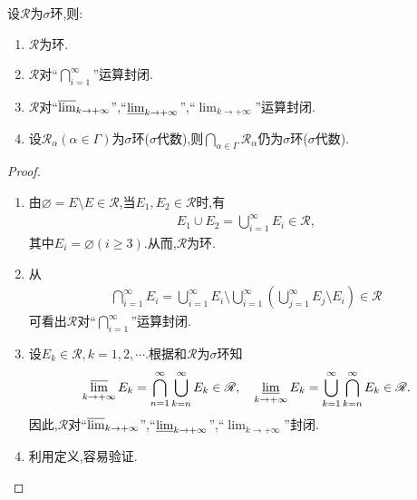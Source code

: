 \documentclass[../../main.tex]{subfiles}%
\begin{document}
\begin{theorem}\label{theorem:sigma环或代数的基本性质}
设$\mathscr{R}$为$\sigma$环,则:
\begin{enumerate}[(1)]
\item\label{theorem:sigma环或代数的基本性质-1} $\mathscr{R}$为环.
\item\label{theorem:sigma环或代数的基本性质-2} $\mathscr{R}$对“$\bigcap_{i=1}^{\infty}$”运算封闭.
\item\label{theorem:sigma环或代数的基本性质-3} $\mathscr{R}$对“$\varlimsup_{k \to +\infty}$”,“$\varliminf_{k \to +\infty}$”,“$\lim_{k \to +\infty}$”运算封闭.

\item\label{theorem:sigma环或代数的基本性质-4} 设$\mathscr{R}_\alpha(\alpha \in \Gamma)$为$\sigma$环($\sigma$代数),则$\bigcap_{\alpha \in \Gamma} \mathscr{R}_\alpha$仍为$\sigma$环($\sigma$代数).
\end{enumerate}
\end{theorem}
\begin{proof}
\begin{enumerate}[(1)]
\item 由$\varnothing = E \setminus E \in \mathscr{R}$,当$E_1,E_2 \in \mathscr{R}$时,有
\begin{align*}
E_1 \cup E_2 = \bigcup_{i=1}^{\infty} E_i \in \mathscr{R},
\end{align*}
其中$E_i = \varnothing(i \geqslant 3)$.从而,$\mathscr{R}$为环.

\item 从
\begin{align*}
\bigcap_{i=1}^{\infty} E_i = \bigcup_{i=1}^{\infty} E_i \setminus \bigcup_{i=1}^{\infty} \left( \bigcup_{j=1}^{\infty} E_j \setminus E_i \right) \in \mathscr{R}
\end{align*}
可看出$\mathscr{R}$对“$\bigcap_{i=1}^{\infty}$”运算封闭.

\item 设$E_k \in \mathscr{R},k=1,2,\cdots$.根据和$\mathscr{R}$为$\sigma$环知
\begin{align*}
\varlimsup_{k \to +\infty} E_k = \bigcap_{n=1}^{\infty} \bigcup_{k=n}^{\infty} E_k \in \mathscr{R}, \quad \varliminf_{k \to +\infty} E_k = \bigcup_{k=1}^{\infty} \bigcap_{k=n}^{\infty} E_k \in \mathscr{R}.
\end{align*}
因此,$\mathscr{R}$对“$\varlimsup_{k \to +\infty}$”,“$\varliminf_{k \to +\infty}$”,“$\lim_{k \to +\infty}$”封闭.

\item 利用定义,容易验证.
\end{enumerate}
\end{proof}
\end{document}
